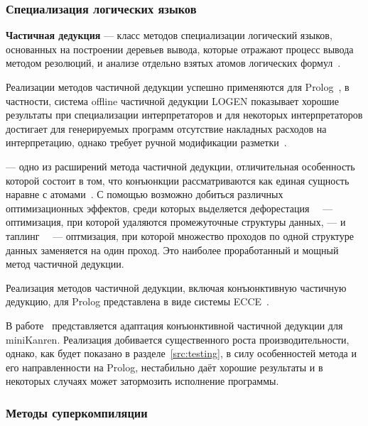 \subsubsection{Специализация логических языков}

{\bf Частичная дедукция} --- класс методов специализации логический языков,
основанных на построении деревьев вывода, которые отражают процесс вывода методом
резолюций, и анализе отдельно взятых атомов логических формул~\cite{advanced}.

Реализации методов частичной дедукции успешно применяются для
Prolog~\cite{prologPE},
в частности, система offline частичной дедукции LOGEN
показывает хорошие результаты при специализации интерпретаторов и
для некоторых интерпретаторов достигает для генерируемых программ
отсутствие накладных расходов на интерпретацию,
однако требует ручной модификации разметки~\cite{offlinePD}.

\Cpd --- одно из расширений метода частичной дедукции, отличительная
особенность которой состоит в том, что конъюнкции рассматриваются как
единая сущность наравне с атомами~\cite{cpd}. С помощью \forcpd
возможно добиться различных оптимизационных эффектов, среди которых
выделяется дефорестация~~\cite{deforest}
--- оптимизация, при которой удаляются промежуточные структуры данных, ---
и таплинг~~\cite{tupling}
--- оптмизация, при которой множество проходов по одной структуре данных заменяется на один проход.
Это наиболее проработанный и мощный метод частичной дедукции.


Реализация методов частичной дедукции, включая конъюнктивную частичную дедукцию, для Prolog
представлена в виде системы ECCE~\cite{ecce}.

В работе~\cite{lozov} представляется адаптация конъюнктивной частичной дедукции для miniKanren.
Реализация добивается существенного роста производительности, однако,
как будет показано в разделе~\ref{src:testing}, в силу особенностей метода и его
направленности на Prolog, нестабильно даёт хорошие результаты и
в некоторых случаях может затормозить исполнение программы.

\subsubsection{Методы суперкомпиляции}

